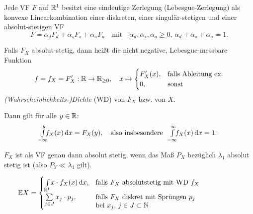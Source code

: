 \documentclass{cheat-sheet}
\newcommand{\E}{\mathbb{E}} %
\begin{document}
\begin{satz}
  Jede VF $F$ auf $\mathbb{R}^1$ besitzt eine eindeutige Zerlegung (Lebesgue-Zerlegung) als konvexe Linearkombination einer diskreten, einer singulär-stetigen und einer absolut-stetigen VF
  \[ F = \alpha_d F_d + \alpha_s F_s + \alpha_a F_a \quad \text{mit} \quad \alpha_d, \alpha_s, \alpha_a \geq 0, \, \alpha_d {+} \alpha_s {+} \alpha_a = 1. \]
\end{satz}

\begin{defn}
  Falls $F_X$ absolut-stetig, dann heißt die nicht negative, Lebesgue-messbare Funktion
  \[ f = f_X = F'_X : \mathbb{R} \to \mathbb{R}_{\geq 0}, \quad x \mapsto \begin{cases} F'_X(x), & \text{falls Ableitung ex.} \\ 0, & \text{sonst} \end{cases} \]
  \emph{(Wahrscheinlichkeits-)Dichte} (WD) von $F_X$  bzw. von $X$.
\end{defn}

\begin{bem}
  Dann gilt für alle $y \in \mathbb{R}$:
  \[ \Int{\mathclap{-\infty}}{y}{f_X(x)}{x} = F_X(y), \quad \text{also insbesondere} \quad \Int{\mathclap{-\infty}}{\infty}{f_X(x)}{x} = 1. \]
\end{bem}

\begin{bem}
  $F_X$ ist als VF genau dann absolut stetig, wenn das Maß $P_X$ bezüglich $\lambda_1$ absolut stetig ist (also $P_Y \ll \lambda_1$ gilt).
\end{bem}



\begin{satz}\mbox{}\vspace{-16pt}
  \[ \E X = \begin{cases}
    \Int{\R^1}{}{x \cdot f_X(x)}{x}, & \text{falls $F_X$ absolutstetig mit WD $f_X$} \\
    \sum_{j \in J} x_j \cdot p_j, & \parbox[t]{.6\textwidth}{falls $F_X$ diskret mit Sprüngen $p_j$ \\ bei $x_j$, $j \in J \subset \N$}
  \end{cases} \]
\end{satz}

\end{document}
